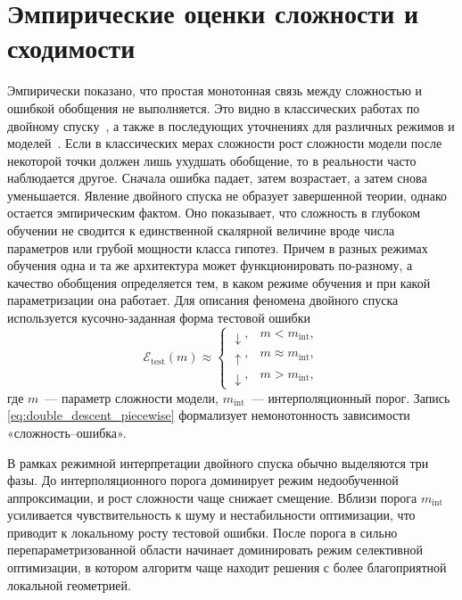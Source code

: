 \section{Эмпирические оценки сложности и сходимости}
Эмпирически показано, что простая монотонная связь между сложностью и ошибкой обобщения не выполняется. Это видно в классических работах по двойному спуску~\cite{belkin2019reconciling,nakkiran2021doubledescent}, а также в последующих уточнениях для различных режимов и моделей~\cite{shcherbina2024vcdd,song2019randomfeatures,advani2020highdim}.
Если в классических мерах сложности рост сложности модели после некоторой точки должен лишь ухудшать обобщение, то в реальности часто наблюдается другое.
Сначала ошибка падает, затем возрастает, а затем снова уменьшается.
Явление двойного спуска не образует завершенной теории, однако остается эмпирическим фактом.
Оно показывает, что сложность в глубоком обучении не сводится к единственной скалярной величине вроде числа параметров или грубой мощности класса гипотез.
Причем в разных режимах обучения одна и та же архитектура может функционировать по-разному, а качество обобщения определяется тем, в каком режиме обучения и при какой параметризации она работает.
Для описания феномена двойного спуска используется кусочно-заданная форма тестовой ошибки
\begin{equation}
\mathcal E_{\mathrm{test}}(m)\approx
\begin{cases}
\downarrow, & m<m_{\mathrm{int}},\\
\uparrow, & m\approx m_{\mathrm{int}},\\
\downarrow, & m>m_{\mathrm{int}},
\end{cases}
\label{eq:double_descent_piecewise}
\end{equation}
где $m$~--- параметр сложности модели, $m_{\mathrm{int}}$~--- интерполяционный порог. Запись \eqref{eq:double_descent_piecewise} формализует немонотонность зависимости «сложность--ошибка».

В рамках режимной интерпретации двойного спуска обычно выделяются три фазы. До интерполяционного порога доминирует режим недообученной аппроксимации, и рост сложности чаще снижает смещение. Вблизи порога $m_{\mathrm{int}}$ усиливается чувствительность к шуму и нестабильности оптимизации, что приводит к локальному росту тестовой ошибки. После порога в сильно перепараметризованной области начинает доминировать режим селективной оптимизации, в котором алгоритм чаще находит решения с более благоприятной локальной геометрией.

